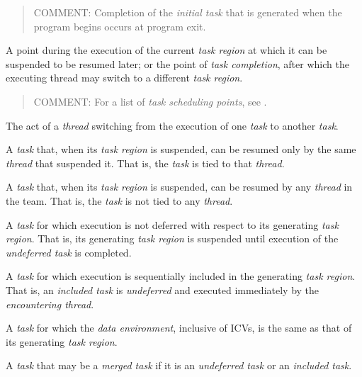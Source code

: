 \begin{quote}
COMMENT: Completion of the \emph{initial task} that is generated when the program begins occurs at program exit.
\end{quote}
\glossarydefend

\glossarydefstart
A point during the execution of the current \emph{task region} at which it can be 
suspended to be resumed later; or the point of \emph{task completion}, after which the 
executing thread may switch to a different \emph{task region}. 

\begin{quote}
COMMENT: For a list of \emph{task scheduling points}, see .
\end{quote}
\glossarydefend

\glossarydefstart
The act of a \emph{thread} switching from the execution of one \emph{task} to another \emph{task}.
\glossarydefend

\glossarydefstart
A \emph{task} that, when its \emph{task region} is suspended, can be resumed only by the same 
\emph{thread} that suspended it. That is, the \emph{task} is tied to that \emph{thread}. 
\glossarydefend

\glossarydefstart
A \emph{task} that, when its \emph{task region} is suspended, can be resumed by any \emph{thread} in 
the team. That is, the \emph{task} is not tied to any \emph{thread}. 
\glossarydefend

\glossarydefstart
A \emph{task} for which execution is not deferred with respect to its generating \emph{task} 
\emph{region}. That is, its generating \emph{task region} is suspended until execution of the 
\emph{undeferred task} is completed.
\glossarydefend

\glossarydefstart
A \emph{task} for which execution is sequentially included in the generating \emph{task region}. 
That is, an \emph{included task} is \emph{undeferred} and executed immediately by the 
\emph{encountering thread}.
\glossarydefend

\glossarydefstart
A \emph{task} for which the \emph{data environment}, inclusive of ICVs, is the same as that of its 
generating \emph{task region}.
\glossarydefend

\glossarydefstart
A \emph{task} that may be a \emph{merged task} if it is an \emph{undeferred task} or an \emph{included task}.
\glossarydefend

